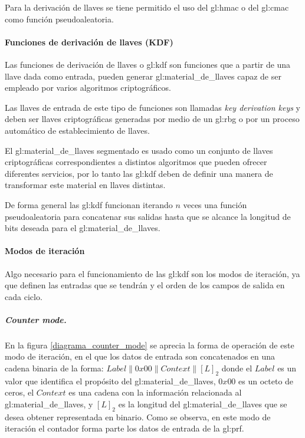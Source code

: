 Para la derivación de llaves se tiene permitido el uso del \gls{gl:hmac} o 
del \gls{gl:cmac} como función pseudoaleatoria.

\paragraph{Funciones de derivación de llaves (KDF)}

Las funciones de derivación de llaves o \gls{gl:kdf} son funciones que a 
partir de una llave dada como entrada, pueden generar 
\gls{gl:material_de_llaves} capaz de ser empleado por varios algoritmos 
criptográficos. 

Las llaves de entrada de este tipo de funciones son llamadas \textit{key 
derivation keys} y deben ser llaves criptográficas generadas por medio de un 
\gls{gl:rbg} o por un proceso automático de establecimiento de llaves.

El \gls{gl:material_de_llaves} segmentado es usado como un conjunto de llaves 
criptográficas correspondientes a distintos algoritmos que pueden ofrecer 
diferentes servicios, por lo tanto las \gls{gl:kdf} deben de definir una 
manera de transformar este material en llaves distintas.

De forma general las \gls{gl:kdf} funcionan iterando $n$ veces una función 
pseudoaleatoria para concatenar sus salidas hasta que se alcance la longitud 
de bits deseada para el \gls{gl:material_de_llaves}.

\paragraph{Modos de iteración}

Algo necesario para el funcionamiento de las \gls{gl:kdf} son los modos de 
iteración, ya que definen las entradas que se tendrán y el orden de los campos 
de salida en cada ciclo.

\subparagraph{Counter mode.}
En la figura \ref{diagrama_counter_mode} se aprecia la forma de operación de 
este modo de iteración, en el que los datos de entrada son concatenados en una 
cadena binaria de la forma: $Label \parallel 0x00 \parallel Context \parallel 
{[L]}_2$ donde el $Label$ es un valor que identifica el propósito del 
\gls{gl:material_de_llaves}, $0x00$ es un octeto de ceros, el $Context$ es una 
cadena con la información relacionada al \gls{gl:material_de_llaves}, y 
${[L]}_2$ es la longitud del \gls{gl:material_de_llaves} que se desea obtener 
representada en binario. Como se observa, en este modo de iteración el 
contador forma parte los datos de entrada de la \gls{gl:prf}.


